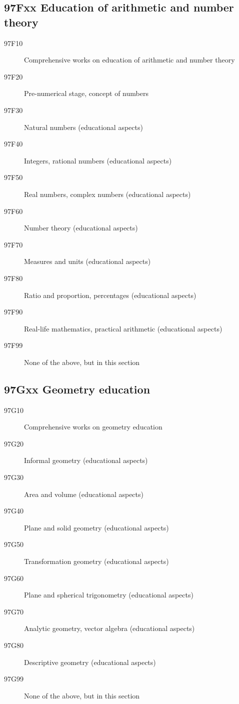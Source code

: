 \documentclass[letterpaper]{article}
\begin{document}
\subsection*{97Fxx  Education of arithmetic and number theory }\label{97Fxx}
\begin{description}  
\item [97F10]\label{97F10} Comprehensive works on education of arithmetic and number theory
\item [97F20]\label{97F20} Pre-numerical stage, concept of numbers
\item [97F30]\label{97F30} Natural numbers (educational aspects)
\item [97F40]\label{97F40} Integers, rational numbers (educational aspects)
\item [97F50]\label{97F50} Real numbers, complex numbers (educational aspects)
\item [97F60]\label{97F60} Number theory (educational aspects)
\item [97F70]\label{97F70} Measures and units (educational aspects)
\item [97F80]\label{97F80} Ratio and proportion, percentages (educational aspects)
\item [97F90]\label{97F90} Real-life mathematics, practical arithmetic (educational aspects)
\item [97F99]\label{97F99} None of the above, but in this section
\end{description}
\subsection*{97Gxx  Geometry education}\label{97Gxx}
\begin{description}  
\item [97G10]\label{97G10} Comprehensive works on geometry education
\item [97G20]\label{97G20} Informal geometry (educational aspects)
\item [97G30]\label{97G30} Area and volume (educational aspects)
\item [97G40]\label{97G40} Plane and solid geometry (educational aspects)
\item [97G50]\label{97G50} Transformation geometry (educational aspects)
\item [97G60]\label{97G60} Plane and spherical trigonometry (educational aspects)
\item [97G70]\label{97G70} Analytic geometry, vector algebra (educational aspects)
\item [97G80]\label{97G80} Descriptive geometry (educational aspects)
\item [97G99]\label{97G99} None of the above, but in this section
\end{description}
\end{document}
